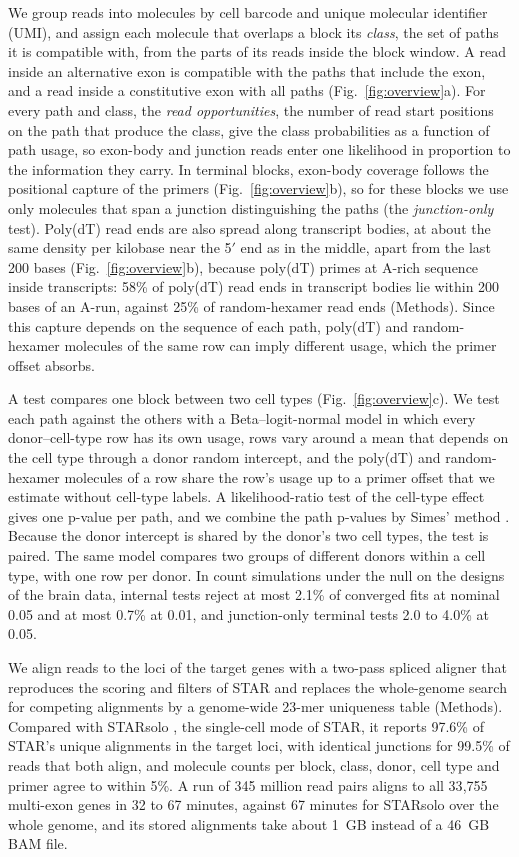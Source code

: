 \documentclass[11pt]{article}
\begin{document}
We group reads into molecules by cell barcode and unique molecular identifier (UMI), and assign each molecule that overlaps a block its \emph{class}, the set of paths it is compatible with, from the parts of its reads inside the block window. A read inside an alternative exon is compatible with the paths that include the exon, and a read inside a constitutive exon with all paths (Fig.~\ref{fig:overview}a). For every path and class, the \emph{read opportunities}, the number of read start positions on the path that produce the class, give the class probabilities as a function of path usage, so exon-body and junction reads enter one likelihood in proportion to the information they carry. In terminal blocks, exon-body coverage follows the positional capture of the primers (Fig.~\ref{fig:overview}b), so for these blocks we use only molecules that span a junction distinguishing the paths (the \emph{junction-only} test). Poly(dT) read ends are also spread along transcript bodies, at about the same density per kilobase near the 5$'$ end as in the middle, apart from the last 200 bases (Fig.~\ref{fig:overview}b), because poly(dT) primes at A-rich sequence inside transcripts: 58\% of poly(dT) read ends in transcript bodies lie within 200 bases of an A-run, against 25\% of random-hexamer read ends (Methods). Since this capture depends on the sequence of each path, poly(dT) and random-hexamer molecules of the same row can imply different usage, which the primer offset absorbs.

A test compares one block between two cell types (Fig.~\ref{fig:overview}c). We test each path against the others with a Beta--logit-normal model in which every donor--cell-type row has its own usage, rows vary around a mean that depends on the cell type through a donor random intercept, and the poly(dT) and random-hexamer molecules of a row share the row's usage up to a primer offset that we estimate without cell-type labels. A likelihood-ratio test of the cell-type effect gives one p-value per path, and we combine the path p-values by Simes' method \cite{simes1986}. Because the donor intercept is shared by the donor's two cell types, the test is paired. The same model compares two groups of different donors within a cell type, with one row per donor. In count simulations under the null on the designs of the brain data, internal tests reject at most 2.1\% of converged fits at nominal 0.05 and at most 0.7\% at 0.01, and junction-only terminal tests 2.0 to 4.0\% at 0.05.

We align reads to the loci of the target genes with a two-pass spliced aligner that reproduces the scoring and filters of STAR \cite{dobin2013} and replaces the whole-genome search for competing alignments by a genome-wide 23-mer uniqueness table (Methods). Compared with STARsolo \cite{kaminow2021}, the single-cell mode of STAR, it reports 97.6\% of STAR's unique alignments in the target loci, with identical junctions for 99.5\% of reads that both align, and molecule counts per block, class, donor, cell type and primer agree to within 5\%. A run of 345 million read pairs aligns to all 33{,}755 multi-exon genes in 32 to 67 minutes, against 67 minutes for STARsolo over the whole genome, and its stored alignments take about 1~GB instead of a 46~GB BAM file.
\end{document}
